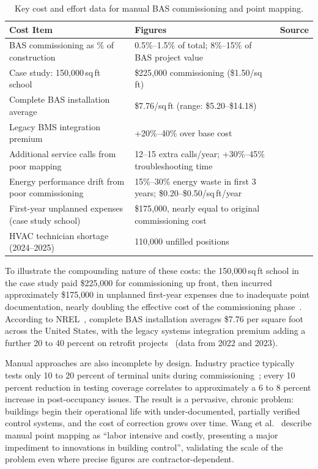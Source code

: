 \begin{table}[htbp]
\centering
\caption{Key cost and effort data for manual BAS commissioning and point mapping.}
\label{tab:commissioning-costs}
\small
\begin{tabular}{p{5.5cm}p{3.5cm}p{4cm}}
\toprule
\textbf{Cost Item} & \textbf{Figures} & \textbf{Source} \\
\midrule
BAS commissioning as \% of construction & 0.5\%--1.5\% of total; 8\%--15\% of BAS project value
  & \cite{BCA2024} \\
\addlinespace
Case study: 150{,}000\,sq\,ft school
  & \$225{,}000 commissioning (\$1.50/sq\,ft)
  & \cite{PingCx2024} \\
\addlinespace
Complete BAS installation average
  & \$7.76/sq\,ft (range: \$5.20--\$14.18)
  & \cite{Trenbath2022} \\
\addlinespace
Legacy BMS integration premium
  & +20\%--40\% over base cost
  & \cite{Envigilance2023} \\
\addlinespace
Additional service calls from poor mapping
  & 12--15 extra calls/year; +30\%--45\% troubleshooting time
  & \cite{PingCx2024} \\
\addlinespace
Energy performance drift from poor commissioning
  & 15\%--30\% energy waste in first 3 years; \$0.20--\$0.50/sq\,ft/year
  & \cite{PingCx2024} \\
\addlinespace
First-year unplanned expenses (case study school)
  & \$175{,}000, nearly equal to original commissioning cost
  & \cite{PingCx2024} \\
\addlinespace
HVAC technician shortage (2024--2025)
  & 110{,}000 unfilled positions
  & \cite{AccessCoins2025} \\
\bottomrule
\end{tabular}
\end{table}

To illustrate the compounding nature of these costs: the 150{,}000\,sq\,ft school in the case study
paid \$225{,}000 for commissioning up front, then incurred approximately \$175{,}000 in unplanned
first-year expenses due to inadequate point documentation, nearly doubling the effective cost of the
commissioning phase~\cite{PingCx2024}.
According to NREL~\cite{Trenbath2022}, complete BAS installation averages \$7.76 per square foot
across the United States, with the legacy systems integration premium adding a further 20 to 40
percent on retrofit projects~\cite{Envigilance2023} (data from 2022 and 2023).

Manual approaches are also incomplete by design.
Industry practice typically tests only 10 to 20 percent of terminal units during commissioning~\cite{PingCx2024};
every 10 percent reduction in testing coverage correlates to approximately a 6 to 8 percent increase
in post-occupancy issues.
The result is a pervasive, chronic problem: buildings begin their operational life with
under-documented, partially verified control systems, and the cost of correction grows over time. 
Wang et al.~\cite{Wang2017} describe manual point mapping as ``labor intensive and costly, presenting
a major impediment to innovations in building control'', validating the scale of the problem even
where precise figures are contractor-dependent.

